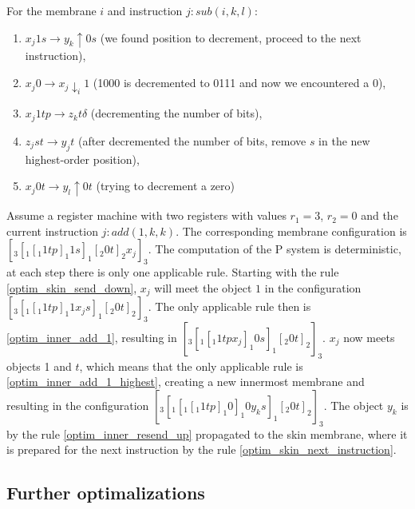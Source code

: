 \documentclass[llncs,submission,copyright,creativecommons]{../lib/lncs/llncs}
\begin{document}
For the membrane $i$ and instruction $j: sub(i,k,l)$:
\begin{enumerate}[resume]
  \item\label{optim_inner_sub_1} $x_j1s \rightarrow y_k \uparrow 0s$ (we found position to decrement, proceed to the next instruction),
  \item\label{optim_inner_sub_0} $x_j0 \rightarrow x_j\downarrow_i 1$ (1000 is decremented to 0111 and now we encountered a 0),
  \item\label{optim_inner_sub_1_highest} $x_j1tp \rightarrow z_kt \delta$ (decrementing the number of bits),
  \item\label{optim_inner_sub_remove_s} $z_jst \rightarrow y_jt$ (after decremented the number of bits, remove $s$ in the new highest-order position),
  \item\label{optim_inner_sub_0_highest} $x_j0t \rightarrow y_l \uparrow 0t$ (trying to decrement a zero)
\end{enumerate}

\begin{example}
  Assume a register machine with two registers with values $r_1=3$, $r_2=0$ and the current instruction $j: add(1,k,k)$. The corresponding membrane configuration is $[_3 [_1 [_1 1 t p ]_1 1 s ]_1 [_2 0 t ]_2 x_j ]_3$. The computation of the P system is deterministic, at each step there is only one applicable rule. Starting with the rule \ref{optim_skin_send_down}, $x_j$ will meet the object $1$ in the configuration $[_3 [_1 [_1 1 t p ]_1 1 x_j s ]_1 [_2 0 t ]_2 ]_3$. The only applicable rule then is \ref{optim_inner_add_1}, resulting in $[_3 [_1 [_1 1 t p x_j ]_1 0 s ]_1 [_2 0 t ]_2 ]_3$. $x_j$ now meets objects 1 and $t$, which means that the only applicable rule is \ref{optim_inner_add_1_highest}, creating a new innermost membrane and resulting in the configuration $[_3 [_1 [_1 [_1 1 t p ]_1 0 ]_1 0 y_k s ]_1 [_2 0 t ]_2 ]_3$. The object $y_k$ is by the rule \ref{optim_inner_resend_up} propagated to the skin membrane, where it is prepared for the next instruction by the rule \ref{optim_skin_next_instruction}.
\end{example}

\subsection{Further optimalizations} %
\label{sub:further_optimalizations}
\end{document}
